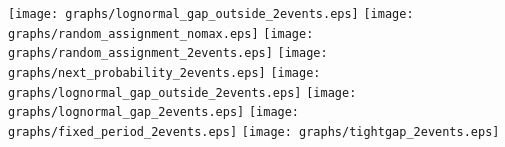 \documentclass{article}
\begin{document}
\texttt{[image: graphs/lognormal\_gap\_outside\_2events.eps]} \pagebreak
\texttt{[image: graphs/random\_assignment\_nomax.eps]} \pagebreak
\texttt{[image: graphs/random\_assignment\_2events.eps]} \pagebreak
\texttt{[image: graphs/next\_probability\_2events.eps]} \pagebreak
\texttt{[image: graphs/lognormal\_gap\_outside\_2events.eps]} \pagebreak
\texttt{[image: graphs/lognormal\_gap\_2events.eps]} \pagebreak
\texttt{[image: graphs/fixed\_period\_2events.eps]} \pagebreak
\texttt{[image: graphs/tightgap\_2events.eps]} \pagebreak
\end{document}
